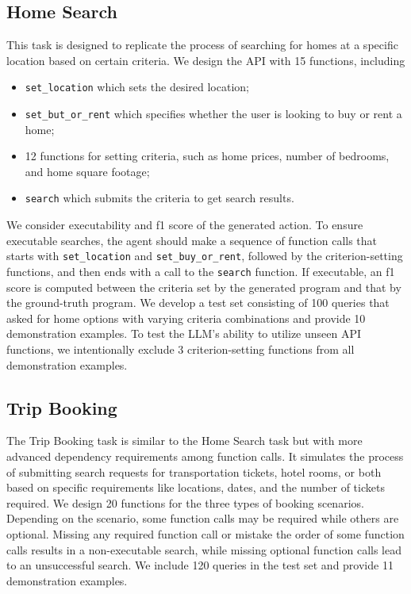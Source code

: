 \subsection{Home Search}
This task is designed to replicate the process of searching for homes at a specific location based on certain criteria. We design the API with 15 functions, including
\begin{itemize}
  \item \texttt{set\_location} which sets the desired location;
  \item \texttt{set\_but\_or\_rent} which specifies whether the user is looking to buy or rent a home;
  \item 12 functions for setting criteria, such as home prices, number of bedrooms, and home square footage;
  \item \texttt{search} which submits the criteria to get search results.
\end{itemize}

We consider executability and f1 score of the generated action. To ensure executable searches, the agent should make a sequence of function calls that starts with \texttt{set\_location} and \texttt{set\_buy\_or\_rent}, followed by the criterion-setting functions, and then ends with a call to the \texttt{search} function. If executable, an f1 score is computed between the criteria set by the generated program and that by the ground-truth program. We develop a test set consisting of 100 queries that asked for home options with varying criteria combinations and provide 10 demonstration examples. To test the LLM's ability to utilize unseen API functions, we intentionally exclude 3 criterion-setting functions from all demonstration examples.

\subsection{Trip Booking}
The Trip Booking task is similar to the Home Search task but with more advanced dependency requirements among function calls. It simulates the process of submitting search requests for transportation tickets, hotel rooms, or both based on specific requirements like locations, dates, and the number of tickets required. We design 20 functions for the three types of booking scenarios. Depending on the scenario, some function calls may be required while others are optional. Missing any required function call or mistake the order of some function calls results in a non-executable search, while missing optional function calls lead to an unsuccessful search. We include 120 queries in the test set and provide 11 demonstration examples.

